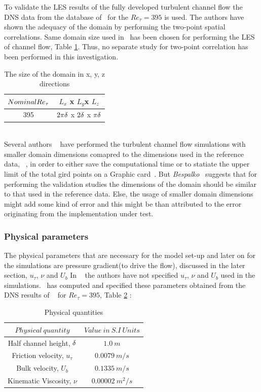 To validate the LES results of the fully developed turbulent channel flow the DNS data from the database of~\cite{moser:kim:mansour:99} for the $Re_\tau = 395$ is used. The authors have shown the adequacy of the domain by performing the two-point spatial correlations. Same domain size used in~\cite{moser:kim:mansour:99} has been chosen for performing the LES of channel flow, Table \ref{Computational Domain}. Thus, no separate study for two-point correlation has been performed in this investigation.
%
\begin{table}[!h]
\centering
\begin{tabular}{c|c}
\hline
$Nominal Re_{\tau}$ & $L_x$ x $L_y $x $L_z$ \\
\hline
%
395   &  $2\pi\delta$ x $2\delta$ x $\pi\delta$  \\
\hline
\end{tabular}
\caption{The size of the domain in x, y, z directions}
\label{Computational Domain}
\end{table}\\
%
Several authors ~\cite{Freitas:11, sonja:12} have performed the turbulent channel flow simulations with smaller domain dimensions comapred to the dimensions used in the reference data, ~\cite{moser:kim:mansour:99}, in order to either save the computational time or to statiate the upper limit of the total gird points on a Graphic card~\cite{sonja:12}. But \emph{Bespalko}~\cite{bespalko:11} suggests that for performing the validation studies the dimensions of the domain should be similar to that used in the reference data. Else, the usage of smaller domain dimensions might add some kind of error and this might be than attributed to the error originating from the implementation under test.

\subsubsection{Physical parameters}
The physical parameters that are necessary for the model set-up and later on for the simulations are pressure gradient(to drive the flow), discussed in the later section, $u_\tau$, $\nu$ and $U_b$
In ~\cite{moser:kim:mansour:99} the authors have not specified $u_\tau$, $\nu$ and $U_b$ used in the simulations.~\cite{devilliers:phd} has computed and specified these parameters obtained from the DNS results of ~\cite{moser:kim:mansour:99} for $Re_\tau = 395$, Table \ref{Physical quantities}  :

%
\begin{table}[!h]
\centering
\begin{tabular}{c|c}
$ Physical\ quantity$ & $Value\ in\ S.I\ Units$  \\
\hline
%
Half channel height, $\delta$ & $1.0\ m$  \\
\hline
%
Friction velocity, $u_\tau$ & $0.0079\ m/s$  \\
\hline
%
Bulk velocity, $U_b$ & $0.1335\ m/s$  \\
\hline
%
Kinematic Viscosity, $\nu$ & $0.00002\ m^2/s$  \\
\hline
%
\end{tabular}
\caption{Physical quantities}
\label{Physical quantities}
\end{table}
%
 
